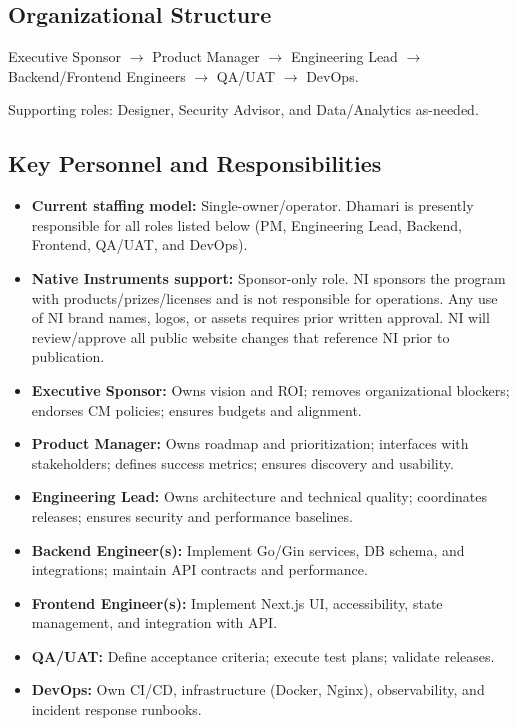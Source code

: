 \documentclass[12pt,a4paper]{article}
\begin{document}
\subsection{Organizational Structure}
Executive Sponsor $\rightarrow$ Product Manager $\rightarrow$ Engineering Lead $\rightarrow$ Backend/Frontend Engineers $\rightarrow$ QA/UAT $\rightarrow$ DevOps.

Supporting roles: Designer, Security Advisor, and Data/Analytics as-needed.

\subsection{Key Personnel and Responsibilities}
\begin{itemize}
\item \textbf{Current staffing model:} Single-owner/operator. Dhamari is presently responsible for all roles listed below (PM, Engineering Lead, Backend, Frontend, QA/UAT, and DevOps).
\item \textbf{Native Instruments support:} Sponsor-only role. NI sponsors the program with products/prizes/licenses and is not responsible for operations. Any use of NI brand names, logos, or assets requires prior written approval. NI will review/approve all public website changes that reference NI prior to publication.
\item \textbf{Executive Sponsor:} Owns vision and ROI; removes organizational blockers; endorses CM policies; ensures budgets and alignment.
\item \textbf{Product Manager:} Owns roadmap and prioritization; interfaces with stakeholders; defines success metrics; ensures discovery and usability.
\item \textbf{Engineering Lead:} Owns architecture and technical quality; coordinates releases; ensures security and performance baselines.
\item \textbf{Backend Engineer(s):} Implement Go/Gin services, DB schema, and integrations; maintain API contracts and performance.
\item \textbf{Frontend Engineer(s):} Implement Next.js UI, accessibility, state management, and integration with API.
\item \textbf{QA/UAT:} Define acceptance criteria; execute test plans; validate releases.
\item \textbf{DevOps:} Own CI/CD, infrastructure (Docker, Nginx), observability, and incident response runbooks.
\end{itemize}
\end{document}
